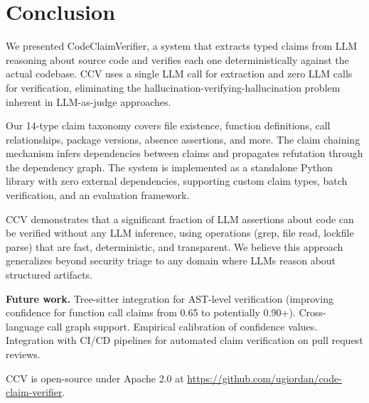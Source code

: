\section{Conclusion}
\label{sec:conclusion}

We presented CodeClaimVerifier, a system that extracts typed claims from LLM reasoning about source code and verifies each one deterministically against the actual codebase. CCV uses a single LLM call for extraction and zero LLM calls for verification, eliminating the hallucination-verifying-hallucination problem inherent in LLM-as-judge approaches.

Our 14-type claim taxonomy covers file existence, function definitions, call relationships, package versions, absence assertions, and more. The claim chaining mechanism infers dependencies between claims and propagates refutation through the dependency graph. The system is implemented as a standalone Python library with zero external dependencies, supporting custom claim types, batch verification, and an evaluation framework.


CCV demonstrates that a significant fraction of LLM assertions about code can be verified without any LLM inference, using operations (grep, file read, lockfile parse) that are fast, deterministic, and transparent. We believe this approach generalizes beyond security triage to any domain where LLMs reason about structured artifacts.

\textbf{Future work.} Tree-sitter integration for AST-level verification (improving confidence for function call claims from 0.65 to potentially 0.90+). Cross-language call graph support. Empirical calibration of confidence values. Integration with CI/CD pipelines for automated claim verification on pull request reviews.

CCV is open-source under Apache 2.0 at \url{https://github.com/ugiordan/code-claim-verifier}.
